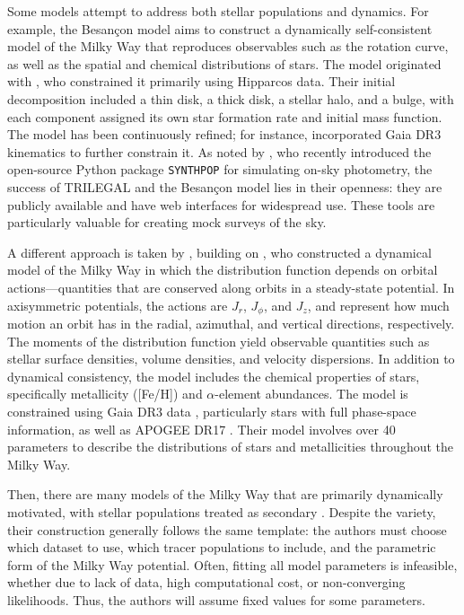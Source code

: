         Some models attempt to address both stellar populations and dynamics. For example, the Besançon model aims to construct a dynamically self-consistent model of the Milky Way that reproduces observables such as the rotation curve, as well as the spatial and chemical distributions of stars. The model originated with \citet{2003A&A...409..523R}, who constrained it primarily using Hipparcos data. Their initial decomposition included a thin disk, a thick disk, a stellar halo, and a bulge, with each component assigned its own star formation rate and initial mass function. The model has been continuously refined; for instance, \citet{2022A&A...667A..98R} incorporated Gaia DR3 kinematics to further constrain it. As noted by \citet{2025AJ....169..317K}, who recently introduced the open-source Python package \texttt{SYNTHPOP} for simulating on-sky photometry, the success of TRILEGAL and the Besançon model lies in their openness: they are publicly available and have web interfaces for widespread use. These tools are particularly valuable for creating mock surveys of the sky.

        A different approach is taken by \citet{2024MNRAS.527.1915B}, building on \citet{2023MNRAS.520.1832B}, who constructed a dynamical model of the Milky Way in which the distribution function depends on orbital actions—quantities that are conserved along orbits in a steady-state potential. In axisymmetric potentials, the actions are $J_r$, $J_\phi$, and $J_z$, and represent how much motion an orbit has in the radial, azimuthal, and vertical directions, respectively. The moments of the distribution function yield observable quantities such as stellar surface densities, volume densities, and velocity dispersions. In addition to dynamical consistency, the model includes the chemical properties of stars, specifically metallicity ([Fe/H]) and $\alpha$-element abundances. The model is constrained using Gaia DR3 data \citep{2023A&A...674A...1G}, particularly stars with full phase-space information, as well as APOGEE DR17 \citep{2017AJ....154...94M}. Their model involves over 40 parameters to describe the distributions of stars and metallicities throughout the Milky Way.

        Then, there are many models of the Milky Way that are primarily dynamically motivated, with stellar populations treated as secondary \citep{1991RMxAA..22..255A,2015ApJS..216...29B,2017MNRAS.465...76M,2017A&A...598A..66P,2024ApJ...967...89I}. Despite the variety, their construction generally follows the same template: the authors must choose which dataset to use, which tracer populations to include, and the parametric form of the Milky Way potential. Often, fitting all model parameters is infeasible, whether due to lack of data, high computational cost, or non-converging likelihoods. Thus, the authors will assume fixed values for some parameters. 

